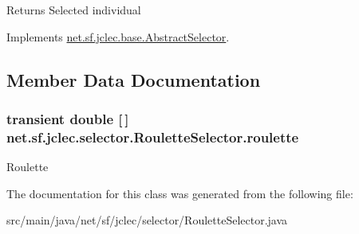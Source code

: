 \begin{DoxyReturn}{Returns}
Selected individual 
\end{DoxyReturn}


Implements \hyperlink{classnet_1_1sf_1_1jclec_1_1base_1_1_abstract_selector_aa2ccb539c608db9c14ebbc763807b95a}{net.\-sf.\-jclec.\-base.\-Abstract\-Selector}.



\subsection{Member Data Documentation}
\hypertarget{classnet_1_1sf_1_1jclec_1_1selector_1_1_roulette_selector_a29c8c082bb1d3e21dc9e9d58848774f7}{
\subsubsection[{roulette}]{\setlength{\rightskip}{0pt plus 5cm}transient double \mbox{[}$\,$\mbox{]} net.\-sf.\-jclec.\-selector.\-Roulette\-Selector.\-roulette\hspace{0.3cm}{\ttfamily [protected]}}}\label{classnet_1_1sf_1_1jclec_1_1selector_1_1_roulette_selector_a29c8c082bb1d3e21dc9e9d58848774f7}
Roulette 

The documentation for this class was generated from the following file\-:\begin{DoxyCompactItemize}
\item 
src/main/java/net/sf/jclec/selector/Roulette\-Selector.\-java\end{DoxyCompactItemize}
